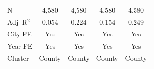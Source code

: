 \begin{tabular*}{\textwidth}{@{\extracolsep{\fill}}lcccc}
   \hline
   N         & 4,580                           & 4,580                               & 4,580                              & 4,580\\  
   Adj. R$^2$       & 0.054                           & 0.224                               & 0.154                              & 0.249\\  
   City FE              & Yes                             & Yes                                 & Yes                                & Yes\\  
   Year FE              & Yes                             & Yes                                 & Yes                                & Yes\\  
   Cluster              & County & County & County & County\\  
   \bottomrule
\end{tabular*}
\par\endgroup
